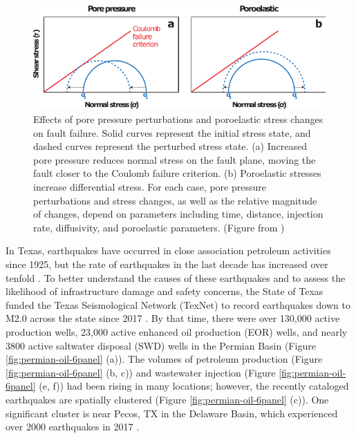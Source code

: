 \begin{figure}
	\centering
	\includegraphics[width=\linewidth]{figures/chapter2-permian/mohr-circles-toponly.pdf}
	\caption[Effects of pore pressure perturbations and poroelastic stress changes on fault failure]{
	Effects of pore pressure perturbations and poroelastic stress changes on fault failure. Solid curves represent the initial stress state, and dashed curves represent the perturbed stress state. (a) Increased pore pressure reduces normal stress on the fault plane, moving the fault closer to the Coulomb failure criterion. (b) Poroelastic stresses increase differential stress. For each case, pore pressure perturbations and stress changes, as well as the relative magnitude of changes, depend on parameters including time, distance, injection rate, diffusivity, and poroelastic parameters.
	(Figure from \cite{Keranen2018InducedSeismicity})
	}
	\label{fig:mohr-circles}
\end{figure}


In Texas, earthquakes have occurred in close association petroleum activities since 1925, but the rate of earthquakes in the last decade has increased over tenfold \citep{Frohlich2016HistoricalReviewInduced, Skoumal2020InducedSeismicityDelaware}.
To better understand the causes of these earthquakes and to assess the likelihood of infrastructure damage and safety concerns, 
the State of Texas funded the Texas Seismological Network (TexNet) to record earthquakes down to M2.0 across the state since 2017 \citep{Savvaidis2019TexnetStatewideSeismological}. 
By that time, there were over 130,000 active production wells, 23,000 active enhanced oil production (EOR) wells, and nearly 3800 active saltwater disposal (SWD) wells in the Permian Basin (Figure \ref{fig:permian-oil-6panel} (a)).  
The volumes of petroleum production (Figure \ref{fig:permian-oil-6panel} (b, c)) and wastewater injection (Figure \ref{fig:permian-oil-6panel} (e, f)) had been rising in many locations; however, the recently cataloged earthquakes are spatially clustered (Figure \ref{fig:permian-oil-6panel} (c)). One significant cluster is near Pecos, TX in the Delaware Basin, which experienced over 2000 earthquakes in 2017 \citep{Frohlich2019OnsetCauseIncreased}. 


